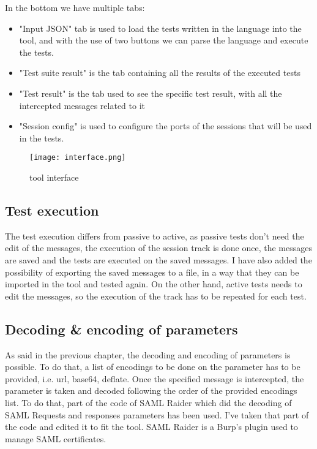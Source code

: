 In the bottom we have multiple tabs:
\begin{itemize}
    \item "Input JSON" tab is used to load the tests written in the language into the tool, and with the use of two buttons we can parse the language and execute the tests.
    \item "Test suite result" is the tab containing all the results of the executed tests
    \item "Test result" is the tab used to see the specific test result, with all the intercepted messages related to it
    \item "Session config" is used to configure the ports of the sessions that will be used in the tests.
\end{itemize}

\begin{figure}
    \texttt{[image: interface.png]}
    \caption{tool interface}
    \label{fig:plugin_interface}
\end{figure}

\subsection{Test execution}
The test execution differs from passive to active, as passive tests don't need the edit of the messages, the execution of the \gls{session track} is done once, the messages are saved and the tests are executed on the saved messages. I have also added the possibility of exporting the saved messages to a file, in a way that they can be imported in the tool and tested again.
On the other hand, active tests needs to edit the messages, so the execution of the track has to be repeated for each test.

\subsection{Decoding \& encoding of parameters}
As said in the previous chapter, the decoding and encoding of parameters is possible. To do that, a list of encodings to be done on the parameter has to be provided, i.e. url, base64, deflate. Once the specified message is intercepted, the parameter is taken and decoded following the order of the provided encodings list. To do that, part of the code of SAML Raider \cite{saml_raider} which did the decoding of SAML Requests and responses parameters has been used. I've taken that part of the code and edited it to fit the tool. SAML Raider is a Burp's plugin used to manage SAML certificates.

